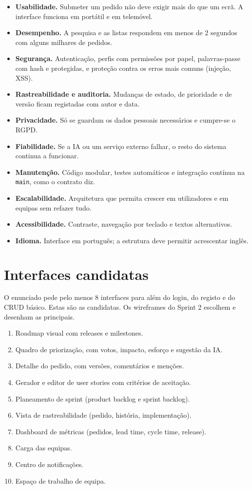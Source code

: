 \documentclass[12pt,a4paper]{article}
\begin{document}
\begin{itemize}
\item \textbf{Usabilidade.} Submeter um pedido não deve exigir mais do que um ecrã. A interface funciona em portátil e em telemóvel.
\item \textbf{Desempenho.} A pesquisa e as listas respondem em menos de 2 segundos com alguns milhares de pedidos.
\item \textbf{Segurança.} Autenticação, perfis com permissões por papel, palavras-passe com hash e protegidas, e proteção contra os erros mais comuns (injeção, XSS).
\item \textbf{Rastreabilidade e auditoria.} Mudanças de estado, de prioridade e de versão ficam registadas com autor e data.
\item \textbf{Privacidade.} Só se guardam os dados pessoais necessários e cumpre-se o RGPD.
\item \textbf{Fiabilidade.} Se a IA ou um serviço externo falhar, o resto do sistema continua a funcionar.
\item \textbf{Manutenção.} Código modular, testes automáticos e integração contínua na \texttt{main}, como o contrato diz.
\item \textbf{Escalabilidade.} Arquitetura que permita crescer em utilizadores e em equipas sem refazer tudo.
\item \textbf{Acessibilidade.} Contraste, navegação por teclado e textos alternativos.
\item \textbf{Idioma.} Interface em português; a estrutura deve permitir acrescentar inglês.
\end{itemize}

\section{Interfaces candidatas}

O enunciado pede pelo menos 8 interfaces para além do login, do registo e do CRUD básico. Estas são as candidatas. Os wireframes do Sprint 2 escolhem e desenham as principais.

\begin{enumerate}
\item Roadmap visual com releases e milestones.
\item Quadro de priorização, com votos, impacto, esforço e sugestão da IA.
\item Detalhe do pedido, com versões, comentários e menções.
\item Gerador e editor de user stories com critérios de aceitação.
\item Planeamento de sprint (product backlog e sprint backlog).
\item Vista de rastreabilidade (pedido, história, implementação).
\item Dashboard de métricas (pedidos, lead time, cycle time, release).
\item Carga das equipas.
\item Centro de notificações.
\item Espaço de trabalho de equipa.
\end{enumerate}
\end{document}
